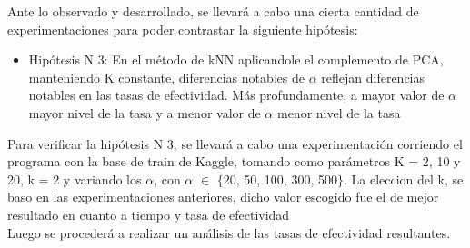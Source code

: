 Ante lo observado y desarrollado, se llevará a cabo una cierta cantidad de experimentaciones
para poder contrastar la siguiente hipótesis:

\begin{itemize}
\item Hipótesis N 3: En el método de kNN aplicandole el complemento de PCA, manteniendo K constante, diferencias notables de $\alpha$ reflejan diferencias notables en las tasas de efectividad. Más profundamente, a mayor valor de $\alpha$ mayor nivel de la tasa y a menor valor de $\alpha$ menor nivel de la tasa
\end{itemize}

Para verificar la hipótesis N 3, se llevará a cabo una experimentación corriendo el programa con la base de train de Kaggle, tomando como parámetros K = 2, 10 y 20, k = 2 y variando los $\alpha$, con $\alpha$ $\in$ $\{$20, 50, 100, 300, 500$\}$. La eleccion del k, se baso en las experimentaciones anteriores, dicho valor escogido fue el de mejor resultado en cuanto a tiempo y tasa de efectividad\\ Luego se procederá a realizar un análisis de las tasas de efectividad resultantes.

